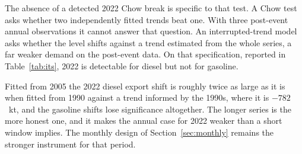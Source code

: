 \documentclass[11pt,a4paper]{article}
\begin{document}
The absence of a detected 2022 Chow break is specific to that test. A Chow test asks whether two
independently fitted trends beat one. With three post-event annual observations it cannot answer
that question. An interrupted-trend model asks whether the level shifts against a trend estimated
from the whole series, a far weaker demand on the post-event data. On that specification,
reported in Table~\ref{tab:its}, 2022 is detectable for diesel but not for gasoline.

Fitted from 2005 the 2022 diesel export shift is roughly twice as large as it is when fitted
from 1990 against a trend informed by the 1990s, where it is $-782$~kt, and the gasoline shifts
lose significance altogether. The longer series is the more honest one, and it makes the annual
case for 2022 weaker than a short window implies. The monthly design of
Section~\ref{sec:monthly} remains the stronger instrument for that period.
\end{document}
